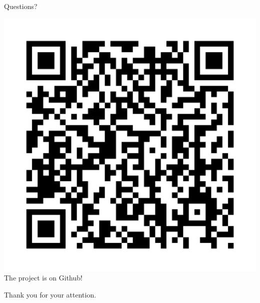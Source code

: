 \documentclass{beamer}
\begin{document}
\begin{frame}{Questions?}
	\begin{minipage}{0.49\textwidth}
		\begin{center}
		\includegraphics[width=\textwidth]{../qr.png}
		The project is on Github!
	\end{center}
	\end{minipage}
	\begin{minipage}{0.49\textwidth}
	Thank you for your attention.
	\end{minipage}
\end{frame}
\end{document}
